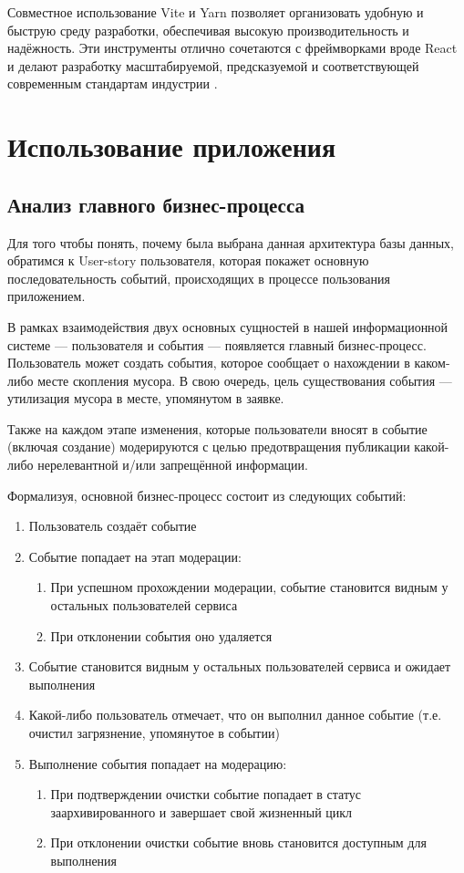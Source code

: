 \documentclass[diploma]{SCWorks}
\begin{document}
Совместное использование Vite и Yarn позволяет организовать удобную и быструю 
среду разработки, обеспечивая высокую производительность и надёжность. 
Эти инструменты отлично сочетаются с фреймворками вроде React и делают 
разработку масштабируемой, предсказуемой и соответствующей современным 
стандартам индустрии \cite{vite,yarn}.

\section{Использование приложения}

\subsection{Анализ главного бизнес-процесса}

Для того чтобы понять, почему была выбрана данная архитектура базы данных, 
обратимся к User-story пользователя, которая покажет основную последовательность
событий, происходящих в процессе пользования приложением.

В рамках взаимодействия двух основных сущностей в нашей информационной системе — 
пользователя и события — появляется главный бизнес-процесс. Пользователь может 
создать события, которое сообщает о нахождении в каком-либо месте скопления 
мусора. В свою очередь, цель существования события — утилизация мусора в 
месте, упомянутом в заявке.

Также на каждом этапе изменения, которые пользователи вносят в событие 
(включая создание) модерируются с целью предотвращения публикации какой-либо
нерелевантной и/или запрещённой информации.

Формализуя, основной бизнес-процесс состоит из следующих событий:
\begin{enumerate}
    \item Пользователь создаёт событие
    \item Событие попадает на этап модерации:
    \begin{enumerate}
        \item При успешном прохождении модерации, событие становится видным
        у остальных пользователей сервиса
        \item При отклонении события оно удаляется
    \end{enumerate}
    \item Событие становится видным у остальных пользователей сервиса и ожидает
    выполнения
    \item Какой-либо пользователь отмечает, что он выполнил данное событие (т.е.
    очистил загрязнение, упомянутое в событии)
    \item Выполнение события попадает на модерацию:
    \begin{enumerate}
        \item При подтверждении очистки событие попадает в статус 
        заархивированного и завершает свой жизненный цикл
        \item При отклонении очистки событие вновь становится доступным для 
        выполнения
    \end{enumerate}
\end{enumerate}
\end{document}
